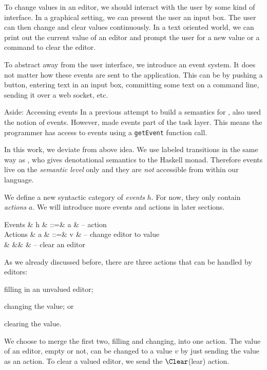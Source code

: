 To change values in an editor,
we should interact with the user by some kind of interface.
In a graphical setting,
we can present the user an input box.
The user can then change and clear values continuously.
In a text oriented world,
we can print out the current value of an editor
and prompt the user for a new value
or a command to clear the editor.

To abstract away from the user interface,
we introduce an event system.
It does not matter how these events are sent to the application.
This can be by pushing a button,
entering text in an input box,
committing some text on a command line,
sending it over a web socket,
etc.

\begin{margintext}{Aside: Accessing events}
In a previous attempt to build a semantics for \TOP,
\textcite{theses/radboud/VinterHviid18} also used the notion of events.
However, \citeauthor{theses/radboud/VinterHviid18} made events part of the task layer.
This means the programmer has access to events using a \texttt{getEvent} function call.

In this work,
we deviate from above idea.
We use labeled transitions in the same way as \textcite{school/maktoberdorf/PeytonJones01},
who gives denotational semantics to the Haskell \IO monad.
Therefore events live on the \emph{semantic level} only
and they are \emph{not} accessible from within our language.
\end{margintext}

We define a new syntactic category of \emph{events} $h$.
For now, they only contain \emph{actions} $a$.
We will introduce more events and actions in later sections.
\begin{grammar}
  Events
    & h & ::=& a      & – action \\
  Actions
    & a & ::=& v      & – change editor to value \\
    &   &\mid& \Clear & – clear an editor \\
\end{grammar}

As we already discussed before,
there are three actions that can be handled by editors:
\begin{enumerate*}
  \item filling in an unvalued editor;
  \item changing the value; or
  \item clearing the value.
\end{enumerate*}
We choose to merge the first two, filling and changing, into one action.
The value of an editor, empty or not, can be changed to a value $v$ by just sending the value as an action.
To clear a valued editor, we send the $\Clear$(lear) action.

